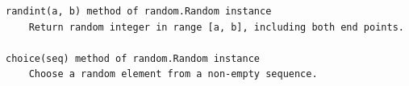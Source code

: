 \begin{lstlisting}
randint(a, b) method of random.Random instance
    Return random integer in range [a, b], including both end points.
	
choice(seq) method of random.Random instance
    Choose a random element from a non-empty sequence.
\end{lstlisting}
%
%
%
%
%	
%
